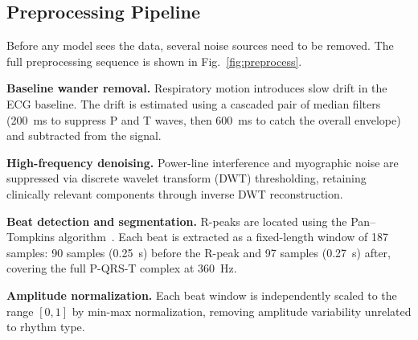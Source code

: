 \documentclass[conference]{IEEEtran}
\begin{document}
\subsection{Preprocessing Pipeline}
Before any model sees the data, several noise sources need to be removed. The full preprocessing sequence is shown in Fig.~\ref{fig:preprocess}.
 
\textbf{Baseline wander removal.} Respiratory motion introduces slow drift in the ECG baseline. The drift is estimated using a cascaded pair of median filters (200~ms to suppress P and T waves, then 600~ms to catch the overall envelope) and subtracted from the signal.
 
\textbf{High-frequency denoising.} Power-line interference and myographic noise are suppressed via discrete wavelet transform (DWT) thresholding, retaining clinically relevant components through inverse DWT reconstruction.
 
\textbf{Beat detection and segmentation.} R-peaks are located using the Pan--Tompkins algorithm~\cite{pantompkins1985}. Each beat is extracted as a fixed-length window of 187 samples: 90 samples (0.25~s) before the R-peak and 97 samples (0.27~s) after, covering the full P-QRS-T complex at 360~Hz.
 
\textbf{Amplitude normalization.} Each beat window is independently scaled to the range $[0, 1]$ by min-max normalization, removing amplitude variability unrelated to rhythm type.
 
\end{document}
